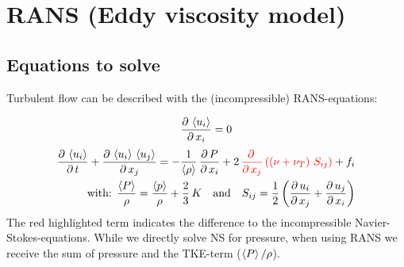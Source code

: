 \documentclass[11pt,a4paper]{article}
\begin{document}
\clearpage

\section{RANS (Eddy viscosity model)}
\subsection{Equations to solve}

Turbulent flow can be described with the (incompressible) RANS-equations:

\begin{align}
\frac{\partial \, \left\langle u_i\right\rangle}{\partial \, x_i}=0
\end{align}
\begin{align}
\frac{\partial \, \left\langle u_i\right\rangle}{\partial \, t}+\frac{\partial \, \left\langle u_i\right\rangle\,\left\langle u_j\right\rangle}{\partial \, x_j}=-\frac{1}{\left\langle\rho\right\rangle}\,\frac{\partial \, P}{\partial \, x_i}+2\,\textcolor{red}{\frac{\partial \, }{\partial \, x_j}\left( \left(\nu+\nu_T\right)\,S_{ij} \right)}+f_i
\\\qquad\text{with: }\frac{\left\langle P\right\rangle}{\rho}=\frac{\left\langle p\right\rangle}{\rho}+\frac{2}{3}\,K
\quad \text{and}\quad
S_{ij}=\frac{1}{2}\left(\frac{\partial \, u_i}{\partial \, x_j}+\frac{\partial \, u_j}{\partial \, x_i}\right)
\nonumber
\end{align}
The red highlighted term indicates the difference to the incompressible Navier-Stokes-equations. While we directly solve NS for pressure, when using RANS we receive the sum of pressure and the TKE-term ($\left\langle P\right\rangle/\rho$).
\end{document}
